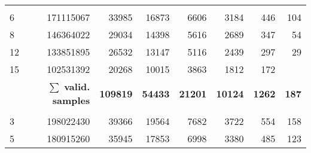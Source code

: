 \begin{table}[hbp]
\begin{tabular}{lrrrrrrr}
                                                         &                                                         &                        &                         &                         &                         &                          &                          \\
6                                                        & 171115067                                               & 33985                  & 16873                   & 6606                    & 3184                    & 446                      & 104                      \\
8                                                        & 146364022                                               & 29034                  & 14398                   & 5616                    & 2689                    & 347                      & 54                       \\
12                                                       & 133851895                                               & 26532                  & 13147                   & 5116                    & 2439                    & 297                      & 29                       \\
15                                                       & 102531392                                               & 20268                  & 10015                   & 3863                    & 1812                    & 172                      &                          \\
\multicolumn{2}{r}{$\mathbf{\sum}$ \textbf{valid. samples}}                  & \textbf{109819}    & \textbf{54433}       & \textbf{21201}    & \textbf{10124}     & \textbf{1262}         & \textbf{187}    \\
                                                         &                                                         &                        &                         &                         &                         &                          &                          \\
3                                                        & 198022430                                               & 39366                  & 19564                   & 7682                    & 3722                    & 554                      & 158                      \\
5                                                        & 180915260                                               & 35945                  & 17853                   & 6998                    & 3380                    & 485                      & 123                      \\

\end{tabular}
\end{table}
